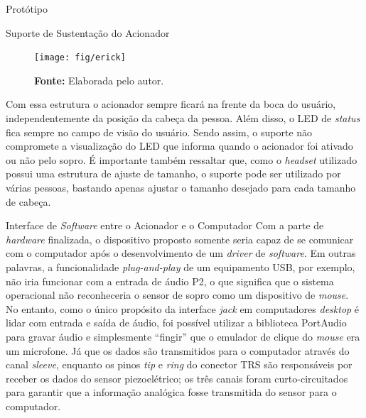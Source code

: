 \begin{chapter}{Protótipo}
\begin{section}{Suporte de Sustentação do Acionador}
\begin{figure}[!h]
	\centering
	\begin{minipage}[c]{\textwidth}
	\centering
	\texttt{[image: fig/erick]}
	\caption{Usuário testando o acionador baseado em sopro em conjunto com o
suporte de sustentação.} %
	\vspace{-1cm}
	\caption*{\textbf{Fonte: }Elaborada pelo autor.}
	\label{fig:suporte}
	\end{minipage}
\end{figure}

Com essa estrutura o acionador sempre ficará na frente da boca do usuário,
independentemente da posição da cabeça da pessoa. Além disso, o LED de
\textit{status} fica sempre no campo de visão do usuário. Sendo assim, o suporte
não compromete a visualização do LED que informa quando o acionador foi ativado
ou não pelo sopro. É importante também ressaltar que, como o \textit{headset}
utilizado possui uma estrutura de ajuste de tamanho, o suporte pode ser
utilizado por várias pessoas, bastando apenas ajustar o tamanho desejado para
cada tamanho de cabeça. 

\end{section}

\begin{section}{Interface de \textit{Software} entre o Acionador e o Computador}
Com a parte de \textit{hardware} finalizada, o dispositivo proposto somente
seria capaz de se comunicar com o computador após o desenvolvimento de um
\textit{driver} de \textit{software}. Em outras palavras, a funcionalidade
\textit{plug-and-play} de um equipamento USB, por exemplo, não iria funcionar
com a entrada de áudio P2, o que significa que o sistema operacional não
reconheceria o sensor de sopro como um dispositivo de \textit{mouse}. No
entanto, como o único propósito da interface \textit{jack} em computadores
\textit{desktop} é lidar com entrada e saída de áudio, foi possível utilizar a
biblioteca PortAudio~\cite{portaudio} para gravar áudio e simplesmente
``fingir'' que o emulador de clique do \textit{mouse} era um microfone. Já
que os dados são transmitidos para o computador através do canal
\textit{sleeve}, enquanto os pinos \textit{tip} e \textit{ring} do conector TRS
são responsáveis por receber os dados do sensor piezoelétrico; os três canais
foram curto-circuitados para garantir que a informação analógica fosse
transmitida do sensor para o computador.


\end{section}
\end{chapter}
